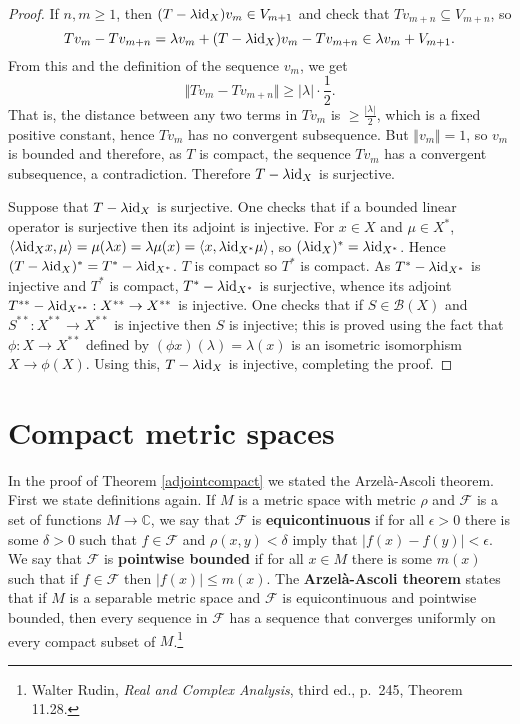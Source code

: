 \documentclass{article}
\newcommand{\inner}[2]{\langle #1, #2 \rangle}
\newcommand{\id}{\ensuremath\mathrm{id}}
\newcommand{\norm}[1]{\Vert #1 \Vert}
\theoremstyle{definition}
\begin{document}
\begin{proof}
If $n,m \geq 1$, then $(T-\lambda \id_X)v_m \in V_{m+1}$ and check that $Tv_{m+n} \subseteq V_{m+n}$, so
\[
Tv_m-Tv_{m+n} = \lambda v_m + (T-\lambda \id_X)v_m - Tv_{m+n} \in \lambda v_m + V_{m+1}.
\]
From this and the definition of the sequence $v_m$, we get
\[
\norm{Tv_m - Tv_{m+n}} \geq |\lambda| \cdot \frac{1}{2}.
\]
That is, the distance between any two terms in $Tv_m$ is $\geq \frac{|\lambda|}{2}$, which is a fixed positive constant, hence $Tv_m$
has no convergent subsequence. But $\norm{v_m}=1$, so $v_m$ is bounded and therefore, as $T$ is compact, the sequence
$Tv_m$ has a convergent subsequence, a contradiction. Therefore $T-\lambda \id_X$ is surjective.

Suppose that $T-\lambda \id_X$ is surjective. One checks that if a bounded linear operator
is surjective then its adjoint is injective. For $x \in X$ and $\mu \in X^*$, 
$\inner{\lambda \id_X x}{\mu}=\mu(\lambda x)=\lambda \mu(x)=\inner{x}{\lambda \id_{X^*} \mu}$, so
$(\lambda \id_X)^* = \lambda \id_{X^*}$. Hence $(T-\lambda \id_X)^* = T^* - \lambda \id_{X^*}$. $T$ is compact
so $T^*$ is compact. As $T^* - \lambda \id_{X^*}$ is injective and $T^*$ is compact, $T^*-\lambda \id_{X^*}$ is surjective,
whence its adjoint $T^{**} - \lambda \id_{X^{**}}:X^{**} \to X^{**}$ is injective. One  checks that if $S \in \mathscr{B}(X)$ and 
$S^{**}:X^{**} \to X^{**}$ is injective then $S$ is injective; this is proved using the fact that
$\phi:X \to X^{**}$ defined by $(\phi x)(\lambda)=\lambda(x)$ is an isometric isomorphism
$X \to \phi(X)$. Using this, $T-\lambda \id_X$ is injective, completing the proof.
\end{proof}



\section{Compact metric spaces}
In the proof of Theorem \ref{adjointcompact} we stated the Arzel\`a-Ascoli theorem. 
First we state definitions again. If $M$ is a metric space with metric $\rho$ and $\mathcal{F}$ is a set of functions
$M \to \mathbb{C}$, we say that $\mathcal{F}$ is \textbf{equicontinuous} if for all $\epsilon>0$ there is some $\delta>0$
such that $f \in \mathcal{F}$ and $\rho(x,y)<\delta$ imply that $|f(x)-f(y)|<\epsilon$. We say that $\mathcal{F}$ is \textbf{pointwise bounded}
if for all $x \in M$ there is some $m(x)$ such that if $f \in \mathcal{F}$ then $|f(x)| \leq m(x)$. The \textbf{Arzel\`a-Ascoli theorem} states that
if $M$ is a separable metric space and $\mathcal{F}$ is  equicontinuous and pointwise bounded, then every sequence in $\mathcal{F}$ has a sequence
that converges uniformly on every compact subset of $M$.\footnote{Walter Rudin, {\em Real and Complex Analysis}, third ed., p.~245, Theorem 11.28.}
\end{document}
